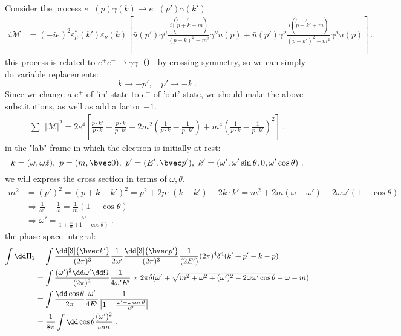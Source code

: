 

Consider the process $e^-(p)\gamma(k)\rightarrow e^-(p')\gamma(k')$
\begin{equation}\begin{aligned}
i\mathcal{M} &= (-ie)^2 \varepsilon_\mu^*(k')\varepsilon_\nu(k) \left[\bar u(p')\gamma^\mu \frac{i(\not{p}+\not{k}+m)}{(p+k)^2-m^2} \gamma^\nu u(p)+ 
\bar u(p')\gamma^\nu \frac{i(\not{p}-\not{k}'+m)}{(p-k')^2-m^2} \gamma^\mu u(p)
\right]~.
\end{aligned}\end{equation}
this process is related to  $e^+e^-\rightarrow \gamma\gamma$（） by crossing symmetry, so we can simply do variable replacements:
\[
k\rightarrow -p',\quad p'\rightarrow -k~.
\]
Since we change a $e^+$ of 'in' state to $e^-$ of 'out' state, we should make the above substitutions, as well as add a factor $-1$.
\begin{equation}\begin{aligned}
\overline{\sum}|\mathcal{M}|^2
=2e^4\left[\frac{p\cdot k'}{p\cdot k}+\frac{p\cdot k}{p\cdot k'}+2m^2\left(\frac{1}{p\cdot k}-\frac{1}{p\cdot k'}\right)+m^4\left(\frac{1}{p\cdot k}-\frac{1}{p\cdot k'}\right)^2\right]~.
\end{aligned}\end{equation}
in the "lab" frame in which the electron is initially at rest:
\[
k=(\omega,\omega \hat z), \ p=(m,\bvec 0),\ p'=(E',\bvec p'),\ k'=(\omega',\omega'\sin\theta,0,\omega'\cos\theta)~.
\]
we will express the cross section in terms of $\omega,\theta$.
\begin{equation}\begin{aligned}
m^2&=(p')^2=(p+k-k')^2=p^2+2p\cdot(k-k')-2k\cdot k'=m^2+2m(\omega-\omega')-2\omega\omega'(1-\cos\theta)\\
&\Rightarrow 
\frac{1}{\omega'}-\frac{1}{\omega}=\frac{1}{m}(1-\cos\theta)\\
&\Rightarrow \omega'=\frac{\omega}{1+\frac{\omega}{m}(1-\cos\theta)}~.
\end{aligned}\end{equation}
the phase space integral:
\begin{equation}\begin{aligned}
\int \dd \Pi_2 &= \int \frac{\dd[3]{\bvec k'}}{(2\pi)^3} \frac{1}{2\omega'} \frac{\dd[3]{\bvec p'}}{(2\pi)^3}\frac{1}{(2 E')}(2\pi)^4 \delta^4(k'+p'-k-p)\\
&=\int \frac{(\omega')^2\dd \omega' \dd \Omega}{(2\pi)^3} \frac{1}{4\omega'E'}\times 2\pi \delta(\omega'+\sqrt{m^2+\omega^2+(\omega')^2-2\omega\omega'\cos\theta}-\omega-m)\\
&=\int \frac{\dd \cos\theta}{2\pi}\frac{\omega'}{4E'}\frac{1}{\left|1+\frac{\omega'-\omega\cos\theta}{E'}\right|}\\
&=\frac{1}{8\pi}\int \dd \cos\theta\frac{(\omega')^2}{\omega m}~.
\end{aligned}\end{equation}
